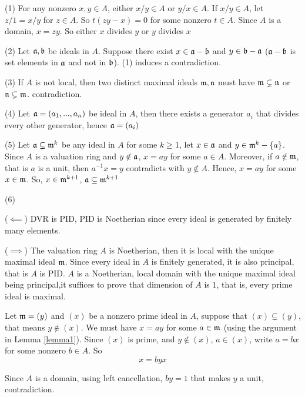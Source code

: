\begin{longproof}
	(1) For any nonzero $x, y \in A$, either $x / y \in A$ or $y / x \in A$. If $x / y \in A$, let $z / 1 = x / y$ for $z \in A$. So $t(zy - x) = 0$ for some nonzero $t \in A$. Since $A$ is a domain, $x = zy$. So either $x$ divides $y$ or $y$ divides $x$
	
	(2) Let $\mathfrak{a}, \mathfrak{b}$ be ideals in $A$. Suppose there exist $x \in \mathfrak{a} - \mathfrak{b}$ and $y \in \mathfrak{b} - \mathfrak{a}$ ($\mathfrak{a} - \mathfrak{b}$ is set elements in $\mathfrak{a}$ and not in $\mathfrak{b}$). (1) induces a contradiction.
	
	(3) If $A$ is not local, then two distinct maximal ideals $\mathfrak{m}, \mathfrak{n}$ must have $\mathfrak{m} \subsetneq \mathfrak{n}$ or $\mathfrak{n} \subsetneq \mathfrak{m}$. contradiction.
	
	(4) Let $\mathfrak{a} = (a_1, ..., a_n)$ be ideal in $A$, then there exists a generator $a_i$ that divides every other generator, hence $\mathfrak{a} = (a_i)$
	
	(5) Let $\mathfrak{a} \subsetneq \mathfrak{m}^k$ be any ideal in $A$ for some $k \geq 1$, let $x \in \mathfrak{a}$ and $y \in \mathfrak{m}^k - \{a\}$. Since $A$ is a valuation ring and $y \notin \mathfrak{a}$, $x = ay$ for some $a \in A$. Moreover, if $a \notin \mathfrak{m}$, that is $a$ is a unit, then $a^{-1} x = y$ contradicts with $y \notin A$. Hence, $x = ay$ for some $x \in \mathfrak{m}$. So, $x \in \mathfrak{m}^{k+1}$, $\mathfrak{a} \subseteq \mathfrak{m}^{k+1}$	

	(6) 
\end{longproof}

\begin{longproof}
	($\impliedby$) DVR is PID, PID is Noetherian since every ideal is generated by finitely many elements.
	
	($\implies$) The valuation ring $A$ is Noetherian, then it is local with the unique maximal ideal $\mathfrak{m}$. Since every ideal in $A$ is finitely generated, it is also principal, that is $A$ is PID. $A$ is a Noetherian, local domain with the unique maximal ideal being principal,it suffices to prove that dimension of $A$ is $1$, that is, every prime ideal is maximal.
	
	Let $\mathfrak{m} = (y)$ and $(x)$ be a nonzero prime ideal in $A$, suppose that $(x) \subsetneq (y)$, that means $y \notin (x)$. We must have $x = ay$ for some $a \in \mathfrak{m}$ (using the argument in Lemma \ref{lemma1}). Since $(x)$ is prime, and $y \notin (x)$, $a \in (x)$, write $a = bx$ for some nonzero $b \in A$. So
	$$
		x = byx
	$$
	
	Since $A$ is a domain, using left cancellation, $by = 1$ that makes $y$ a unit, contradiction.
\end{longproof}

